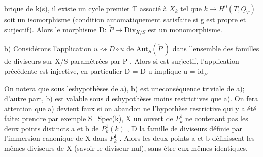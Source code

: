 brique de k(s), il existe un cycle premier T associé à $X_k$ tel que
$k \to H^0(T,\underline{O}_T)$ soit un isomorphisme (condition automatiquement satisfaite
si g est propre et surject\uline{i}f). Alors le morphisme D: $\check{P} \longrightarrow \mathrm{Div}_{X/S}$ est
un monomorphisme.

b)  Considérons l'application $u \rightsquigarrow D\circ u$ de
$\mathrm{Aut}_S(\check{P}\ )$ dans l'ensemble des familles de diviseurs sur X/S paramétrées
par P . Alors si  est surjectif, l'application précédente est injective,
en particulier D = D u implique u = $\mathrm{id}_{\check{P}}$

On notera que sous leshypothèses de a), b) est uneconséquence
triviale de a); d'autre part, b) est valable sous d eshypothèses moins
restrictives que a). On fera attention que a) devient faux si on abandon
ne l'hypothèse restrictive qui y a  été faite: prendre par exemple
S=Spec(k), X un ouvert de $P^1_k$ ne contenant pas les deux points distincts
a et b de $P^1_k(k)$ , D la famille de diviseurs définie par l'immersion
canonique de X dans $P^1_k$ . Alors les deux  points a et b
définissent les mêmes diviseurs de X (savoir le diviseur nul), sans être
eux-mêmes identiques.

